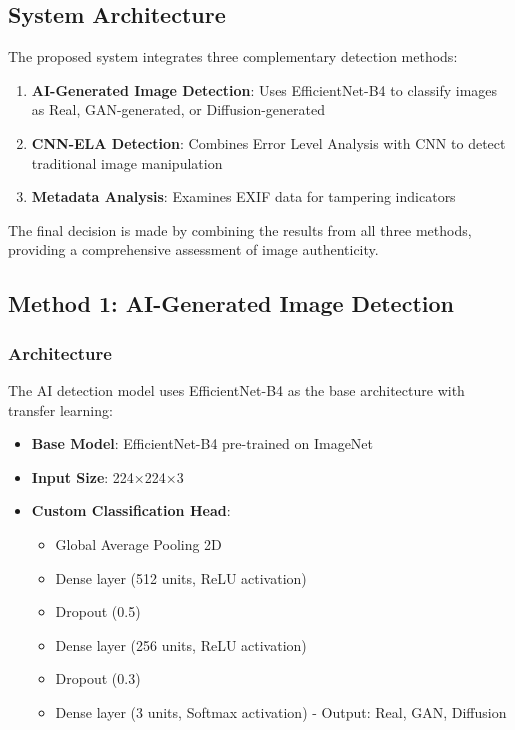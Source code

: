 \documentclass[12pt,a4paper]{article}
\begin{document}
\subsection{System Architecture}
The proposed system integrates three complementary detection methods:

\begin{enumerate}
    \item \textbf{AI-Generated Image Detection}: Uses EfficientNet-B4 to classify images as Real, GAN-generated, or Diffusion-generated
    \item \textbf{CNN-ELA Detection}: Combines Error Level Analysis with CNN to detect traditional image manipulation
    \item \textbf{Metadata Analysis}: Examines EXIF data for tampering indicators
\end{enumerate}

The final decision is made by combining the results from all three methods, providing a comprehensive assessment of image authenticity.

\subsection{Method 1: AI-Generated Image Detection}

\subsubsection{Architecture}
The AI detection model uses EfficientNet-B4 as the base architecture with transfer learning:

\begin{itemize}
    \item \textbf{Base Model}: EfficientNet-B4 pre-trained on ImageNet
    \item \textbf{Input Size}: 224×224×3
    \item \textbf{Custom Classification Head}:
    \begin{itemize}
        \item Global Average Pooling 2D
        \item Dense layer (512 units, ReLU activation)
        \item Dropout (0.5)
        \item Dense layer (256 units, ReLU activation)
        \item Dropout (0.3)
        \item Dense layer (3 units, Softmax activation) - Output: Real, GAN, Diffusion
    \end{itemize}
\end{itemize}
\end{document}
